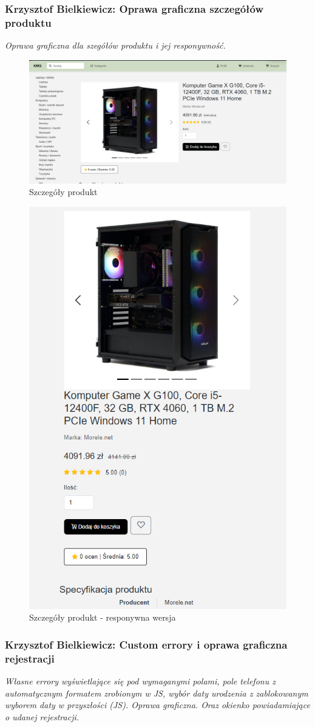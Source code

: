 \documentclass[12pt,a4paper,oneside]{article}
\theoremstyle{definition}
\numberwithin{equation}{section}
\begin{document}
\subsubsection{Krzysztof Bielkiewicz: Oprawa graficzna szczegółów produktu}
\label{1.3.16}
\textit{Oprawa graficzna dla szegółów produktu i jej responywność.}
\begin{figure}[H]
    \centering
    \includegraphics[width=1.0\columnwidth]{images/krzysztofBImages/product-detail.png}
    \caption{Szczegóły produkt}
    \label{product-detail}
\end{figure}
\begin{figure}[H]
    \centering
    \includegraphics[width=0.5\columnwidth]{images/krzysztofBImages/product-detail-respo.png}
    \caption{Szczegóły produkt - responywna wersja}
    \label{product-detail-respo}
\end{figure}


\subsubsection{Krzysztof Bielkiewicz: Custom errory i oprawa graficzna rejestracji}
\label{1.3.17}
\textit{Własne errory wyświetlające się pod wymaganymi polami,
pole telefonu z automatycznym formatem zrobionym w JS,
 wybór daty urodzenia z zablokowanym wyborem daty w przyszłości (JS). Oprawa graficzna.
 Oraz okienko powiadamiające o udanej rejestracji.}
\end{document}
